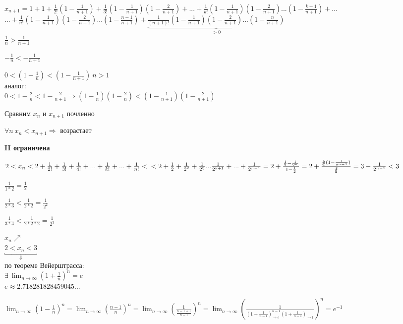 \documentclass{article}
\begin{document}
    \(x_{n+1} = 1 + 1 + \frac{1}{2!}(1-\frac{1}{n+1}) + \frac{1}{3!}(1-\frac{1}{n+1})(1-\frac{2}{n+1})+...+\frac{1}{k!}(1-\frac{1}{n+1})(1-\frac{2}{n+1})...(1-\frac{k-1}{n+1})+...\)\\
    \(...+\frac{1}{n!}(1-\frac{1}{n+1})(1-\frac{2}{n+1})...(1-\frac{n-1}{n+1}) + \underbrace{\frac{1}{(n+1)!}(1-\frac{1}{n+1})(1-\frac{2}{n+1})...(1-\frac{n}{n+1})}_{> 0}\)\\

    \(\frac{1}{n} > \frac{1}{n+1}\)

    \(-\frac{1}{n} < -\frac{1}{n+1}\)

    \(0 < (1-\frac{1}{n}) < (1-\frac{1}{n+1})\ n > 1\) 
    \\аналог: \\\(0 < 1-\frac{2}{n} < 1-\frac{2}{n+1} \Rightarrow (1-\frac{1}{n})(1-\frac{2}{n}) < (1 - \frac{1}{n+1})(1 - \frac{2}{n+1})\)
    
    Сравним \(x_n\) и \(x_{n+1}\) почленно
    
    \(\forall n \ x_n < x_{n+1} \Rightarrow\) возрастает

    \textbf{II ограничена}

    \( 2 < x_n < 2 + \frac{1}{2!} + \frac{1}{3!} + \frac{1}{4!} + ... + \frac{1}{k!} + ... + \frac{1}{n!} <\\
    < 2 + \frac{1}{2} + \frac{1}{2^2} + \frac{1}{2^3} ... \frac{1}{2^{k+1}}+...+\frac{1}{2^{n-1}} = 2 + \frac{\frac{1}{2} - \frac{1}{2^n}}{1 - \frac{1}{2}} = 2 + \frac{\not\frac{1}{2}(1-\frac{1}{2^{n-1}})}{\not\frac{1}{2}} = 3 - \frac{1}{2^{n-1}} < 3\)

    \( \frac{1}{1*2} = \frac{1}{2} \)

    \( \frac{1}{2*3} < \frac{1}{2*2} = \frac{1}{2^2} \)

    \( \frac{1}{3*4} < \frac{1}{2*2*2} = \frac{1}{2^3} \)

    \( x_n \nearrow \)\\
    \(\underbracket{2 < x_n < 3}_{\Downarrow} \)\\
    по теореме Вейерштрасса:\\
    \( \exists\ \lim_{n \rightarrow \infty} (1 + \frac{1}{n})^n = e \)
    \\\(e \approx 2.718281828459045...\)

    \(\lim_{n \rightarrow \infty}{(1 - \frac{1}{n})^n} = \lim_{n \rightarrow \infty}{(\frac{n-1}{n})^n} = \lim_{n \rightarrow \infty}{(\frac{1}{\frac{n-1+1}{n-1}})^n} = \lim_{n \rightarrow \infty}{(\frac{1}{(1 + \frac{1}{n-1})^{n-1}_{\rightarrow e}(1 + \frac{1}{n-1})_{\rightarrow 1}})^n} = e^{-1}\)
\end{document}
